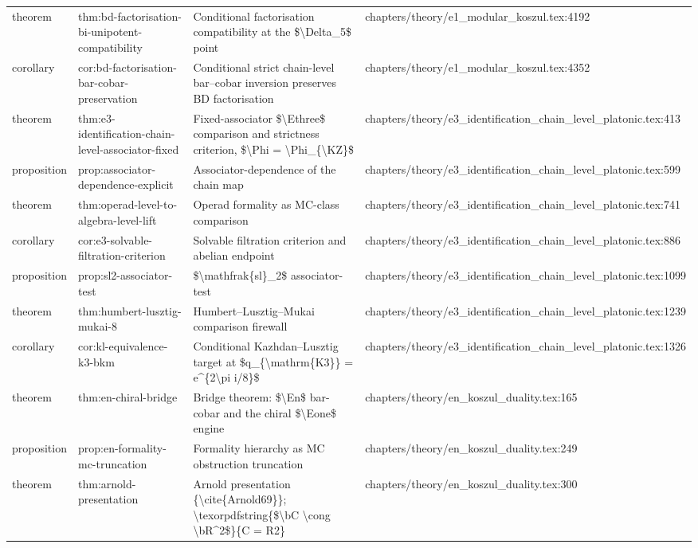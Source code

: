\documentclass[11pt]{article}
\begin{document}
\begin{longtable}{L{0.10\textwidth}L{0.26\textwidth}L{0.42\textwidth}L{0.22\textwidth}}
theorem & thm:bd-factorisation-bi-unipotent-compatibility & Cond{}itional factorisation compatibility at the \$\textbackslash{}Delta\_5\$ point & chapters/theory/e1\_modular\_koszul.tex:4192\\
corollary & cor:bd-factorisation-bar-cobar-preservation & Cond{}itional strict chain-level bar--cobar inversion preserves BD factorisation & chapters/theory/e1\_modular\_koszul.tex:4352\\
theorem & thm:e3-identification-chain-level-associator-fixed & Fixed-associator \$\textbackslash{}Ethree\$ comparison and strictness criterion, \$\textbackslash{}Phi = \textbackslash{}Phi\_\{\textbackslash{}KZ\}\$ & chapters/theory/e3\_identification\_chain\_level\_platonic.tex:413\\
proposition & prop:associator-dependence-explicit & Associator-dependence of the chain map & chapters/theory/e3\_identification\_chain\_level\_platonic.tex:599\\
theorem & thm:operad-level-to-algebra-level-lift & Operad formality as MC-class comparison & chapters/theory/e3\_identification\_chain\_level\_platonic.tex:741\\
corollary & cor:e3-solvable-filtration-criterion & Solvable filtration criterion and abelian endpoint & chapters/theory/e3\_identification\_chain\_level\_platonic.tex:886\\
proposition & prop:sl2-associator-test & \$\textbackslash{}mathfrak\{sl\}\_2\$ associator-test & chapters/theory/e3\_identification\_chain\_level\_platonic.tex:1099\\
theorem & thm:humbert-lusztig-mukai-8 & Humbert--Lusztig--Mukai comparison firewall & chapters/theory/e3\_identification\_chain\_level\_platonic.tex:1239\\
corollary & cor:kl-equivalence-k3-bkm & Cond{}itional Kazhdan--Lusztig target at \$q\_\{\textbackslash{}mathrm\{K3\}\} = e\textasciicircum{}\{2\textbackslash{}pi i/8\}\$ & chapters/theory/e3\_identification\_chain\_level\_platonic.tex:1326\\
theorem & thm:en-chiral-bridge & Bridge theorem: \$\textbackslash{}En\$ bar-cobar and the chiral \$\textbackslash{}Eone\$ engine & chapters/theory/en\_koszul\_duality.tex:165\\
proposition & prop:en-formality-mc-truncation & Formality hierarchy as MC obstruction truncation & chapters/theory/en\_koszul\_duality.tex:249\\
theorem & thm:arnold-presentation & Arnold presentation \{\textbackslash{}cite\{Arnold69\}\}; \textbackslash{}texorpdfstring\{\$\textbackslash{}bC \textbackslash{}cong \textbackslash{}bR\textasciicircum{}2\$\}\{C = R2\} & chapters/theory/en\_koszul\_duality.tex:300\\

\end{longtable}
\end{document}
